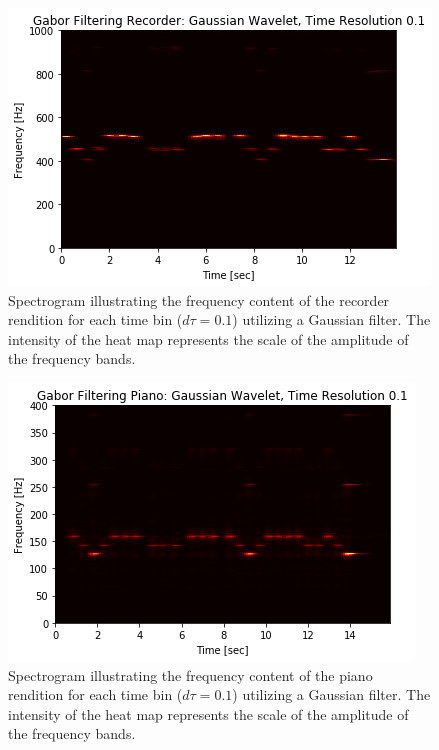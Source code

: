 \documentclass{article}
\begin{document}
\begin{figure}
    \centering
    \includegraphics[width=0.75\linewidth]{HW2_DanielBurnham_files/HW2_DanielBurnham_14_7.png}
    \caption{Spectrogram illustrating the frequency content of the recorder rendition for each time bin ($d\tau = 0.1$) utilizing a Gaussian filter. The intensity of the heat map represents the scale of the amplitude of the frequency bands.}
    \label{fig:recSpec}
\end{figure}
\begin{figure}
    \centering
    \includegraphics[width=0.75\linewidth]{HW2_DanielBurnham_files/HW2_DanielBurnham_15_7.png}
    \caption{Spectrogram illustrating the frequency content of the piano rendition for each time bin ($d\tau = 0.1$) utilizing a Gaussian filter. The intensity of the heat map represents the scale of the amplitude of the frequency bands.}
    \label{fig:pianoSpec}
\end{figure}
\end{document}
